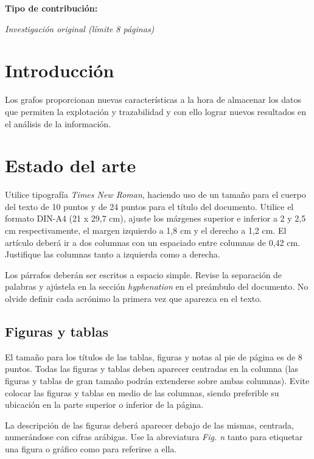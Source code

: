 \documentclass[10pt,conference,a4paper]{IEEEtran}
\begin{document}
{\bf Tipo de contribución:}  {\it Investigación original (límite 8 páginas)

\section{Introducción}

Los grafos proporcionan nuevas características a la hora de almacenar los datos que permiten la explotación y trazabilidad y con ello lograr nuevos resultados en el análisis de la información.\\


\section{Estado del arte}

Utilice tipografía {\it Times New Roman}, haciendo uso de un tamaño para el cuerpo del texto de 10 puntos 
y de 24 puntos para el título del documento. Utilice el formato DIN-A4 (21 x 29,7 cm), ajuste los márgenes 
superior e inferior a 2 y 2,5 cm respectivamente, el margen izquierdo a 1,8 cm y el derecho a 1,2 cm. El 
artículo deberá ir a dos columnas con un espaciado entre columnas de 0,42 cm. Justifique las columnas 
tanto a izquierda como a derecha.

Los párrafos deberán ser escritos a espacio simple. Revise la separación de palabras y ajústela en la sección 
\emph{hyphenation} en el preámbulo del documento. No olvide definir cada acrónimo la primera vez que aparezca 
en el texto.


\subsection{Figuras y tablas}

El tamaño para los títulos de las tablas, figuras y notas al pie de página es de 8 puntos. Todas las figuras 
y tablas deben aparecer centradas en la columna (las figuras y tablas de gran tamaño podrán extenderse sobre 
ambas columnas). Evite colocar las figuras y tablas en medio de las columnas, siendo preferible su ubicación 
en la parte superior o inferior de la página.

La descripción de las figuras  deberá aparecer debajo de las mismas, centrada, numerándose con cifras arábigas. 
Use la abreviatura {\it Fig. n} tanto para etiquetar una figura o gráfico como para referirse a ella.

}
\end{document}
